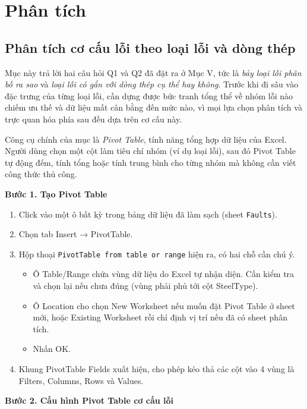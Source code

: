 \documentclass[12pt]{article}
\begin{document}
\clearpage
\section{Phân tích}
\subsection{Phân tích cơ cấu lỗi theo loại lỗi và dòng thép}

Mục này trả lời hai câu hỏi Q1 và Q2 đã đặt ra ở Mục V, tức là \emph{bảy loại lỗi phân bố ra sao} và \emph{loại lỗi có gắn với dòng thép cụ thể hay không}. Trước khi đi sâu vào đặc trưng của từng loại lỗi, cần dựng được bức tranh tổng thể về nhóm lỗi nào chiếm ưu thế và dữ liệu mất cân bằng đến mức nào, vì mọi lựa chọn phân tích và trực quan hóa phía sau đều dựa trên cơ cấu này.

\noindent
Công cụ chính của mục là \emph{Pivot Table}, tính năng tổng hợp dữ liệu của Excel. Người dùng chọn một cột làm tiêu chí nhóm (ví dụ loại lỗi), sau đó Pivot Table tự động đếm, tính tổng hoặc tính trung bình cho từng nhóm mà không cần viết công thức thủ công.\medskip

\noindent
\textbf{Bước 1. Tạo Pivot Table}

\begin{enumerate}
    \item Click vào một ô bất kỳ trong bảng dữ liệu đã làm sạch (sheet \texttt{Faults}).
    \item Chọn tab Insert → PivotTable.
    \item Hộp thoại \texttt{PivotTable from table or range} hiện ra, có hai chỗ cần chú ý.
    \begin{itemize}
        \item Ô Table/Range chứa vùng dữ liệu do Excel tự nhận diện. Cần kiểm tra và chọn lại nếu chưa đúng (vùng phải phủ tới cột SteelType).
        \item Ô Location cho chọn New Worksheet nếu muốn đặt Pivot Table ở sheet mới, hoặc Existing Worksheet rồi chỉ định vị trí nếu đã có sheet phân tích.
        \item Nhấn OK.
    \end{itemize}
    \item Khung PivotTable Fields xuất hiện, cho phép kéo thả các cột vào 4 vùng là Filters, Columns, Rows và Values.
\end{enumerate}

\noindent
\textbf{Bước 2. Cấu hình Pivot Table cơ cấu lỗi}
\end{document}
